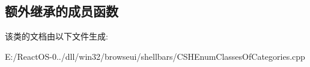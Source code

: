 \subsection*{额外继承的成员函数}


该类的文档由以下文件生成\+:\begin{DoxyCompactItemize}
\item 
E\+:/\+React\+O\+S-\/0../dll/win32/browseui/shellbars/C\+S\+H\+Enum\+Classes\+Of\+Categories.\+cpp\end{DoxyCompactItemize}

